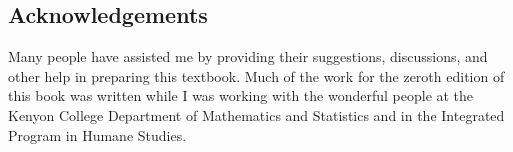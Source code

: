 \subsection*{Acknowledgements}
Many people have assisted me by providing their suggestions, discussions, and other help in preparing this textbook. Much of the work for the zeroth edition of this book was written while I was working with the wonderful people at the Kenyon College Department of Mathematics and Statistics and in the Integrated Program in Humane Studies.
